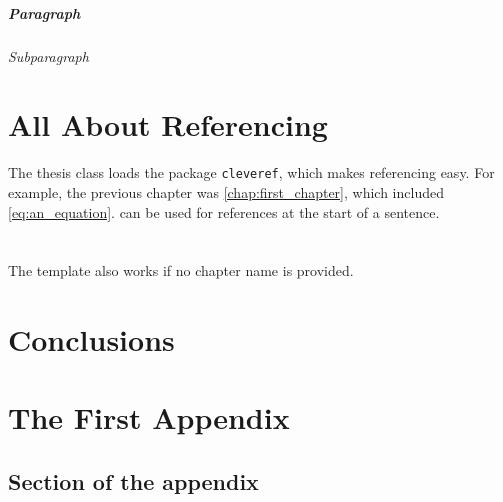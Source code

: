 \documentclass{thesis}
\begin{document}
\paragraph{Paragraph}
\lipsum[16][1-5]
\subparagraph{Subparagraph}
\lipsum[17][1-5]


\chapter{All About Referencing}

The thesis class loads the package \texttt{cleveref}, which makes referencing easy. For example, the previous chapter was \cref{chap:first_chapter}, which included \eqref{eq:an_equation}.  can be used for references at the start of a sentence.


\chapter{}

The template also works if no chapter name is provided.


{
\backmatter
\chapter{Conclusions}
\lipsum[22-26]
\printbibliography[heading=bibintoc,title={References}]
}


\appendix
\chapter{The First Appendix}
\lipsum[18]
\section{Section of the appendix}
\lipsum[19-21]

\end{document}
